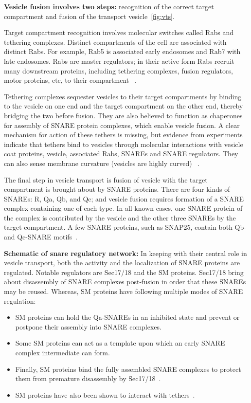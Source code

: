 \textbf{Vesicle fusion involves two steps:} recognition of the correct target compartment and fusion of the transport vesicle~\ref{fig:vts}.

Target compartment recognition involves molecular switches called Rabs and  tethering complexes. Distinct compartments of the cell are associated with distinct Rabs. For example, Rab5 is associated early endosomes and  Rab7 with late endosomes\cite{rink2005rab}.  
%
Rabs are master regulators; in their active form Rabs recruit many downstream proteins, including tethering complexes, fusion regulators, motor proteins, etc, to their compartment ~\cite{muller2018molecular}.

Tethering complexes sequester vesicles to their target compartments by binding to the vesicle on one end and the target compartment on the other end, thereby bridging the two before fusion. 
%
They are also believed to function as chaperones for assembly of SNARE protein complexes, which enable vesicle fusion. 
%
A clear mechanism for action of these tethers is missing, but evidence from experiments indicate that tethers bind to vesicles through molecular interactions with vesicle coat proteins, vesicle, associated Rabs, SNAREs and SNARE regulators. 
%
They can also sense membrane curvature (vesicles are highly curved) ~\cite{baker2016chaperoning}.

The final step in vesicle transport is fusion of vesicle with the target compartment is brought about by SNARE proteins. 
%
There are four kinds of SNAREs: R, Qa, Qb, and Qc; and vesicle fusion requires formation of a SNARE complex containing one of each type. 
%
In all known cases, one SNARE protein of the complex is contributed by the vesicle and the other three SNAREs by the target compartment. 
%
A few SNARE proteins, such as SNAP25, contain both Qb- and Qc-SNARE motifs~\cite{yoon2018snare}.

\textbf{Schematic of snare regulatory network:}
In keeping with their central role in vesicle transport, both the activity and the localization of SNARE proteins are regulated. Notable regulators are Sec17/18 and the SM proteins.
%
Sec17/18 bring about disassembly of SNARE complexes post-fusion in order that these SNAREs may be reused. 
%
Whereas, SM proteins have following multiple modes of SNARE regulation: 
\begin{itemize}
	\item SM proteins can hold
	the Qa-SNAREs in an inhibited state and prevent or postpone their assembly into SNARE
	complexes.
	\item Some SM proteins can act as a template upon which an early SNARE complex intermediate can
	form.
	\item Finally, SM proteins bind the fully assembled
	SNARE complexes to protect them from premature disassembly by Sec17/18~\cite{baker2016chaperoning}.
	\item SM proteins have also been shown to interact with tethers~\cite{yoon2018snare}.
\end{itemize}

